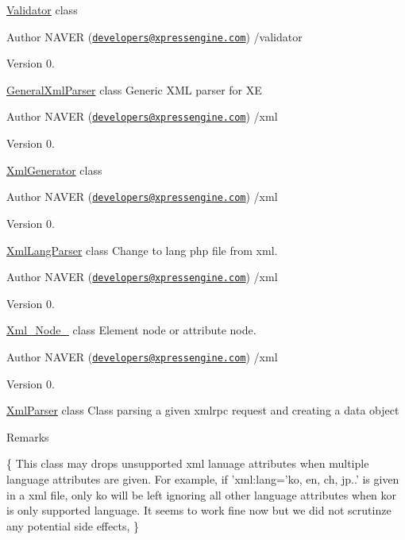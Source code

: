 \hyperlink{classValidator}{Validator} class \begin{DoxyAuthor}{Author}
N\+A\+V\+E\+R (\href{mailto:developers@xpressengine.com}{\tt developers@xpressengine.\+com}) /validator 
\end{DoxyAuthor}
\begin{DoxyVersion}{Version}
0.
\end{DoxyVersion}
\hyperlink{classGeneralXmlParser}{General\+Xml\+Parser} class Generic X\+M\+L parser for X\+E \begin{DoxyAuthor}{Author}
N\+A\+V\+E\+R (\href{mailto:developers@xpressengine.com}{\tt developers@xpressengine.\+com}) /xml 
\end{DoxyAuthor}
\begin{DoxyVersion}{Version}
0.
\end{DoxyVersion}
\hyperlink{classXmlGenerator}{Xml\+Generator} class \begin{DoxyAuthor}{Author}
N\+A\+V\+E\+R (\href{mailto:developers@xpressengine.com}{\tt developers@xpressengine.\+com}) /xml 
\end{DoxyAuthor}
\begin{DoxyVersion}{Version}
0.
\end{DoxyVersion}
\hyperlink{classXmlLangParser}{Xml\+Lang\+Parser} class Change to lang php file from xml. \begin{DoxyAuthor}{Author}
N\+A\+V\+E\+R (\href{mailto:developers@xpressengine.com}{\tt developers@xpressengine.\+com}) /xml 
\end{DoxyAuthor}
\begin{DoxyVersion}{Version}
0.
\end{DoxyVersion}
\hyperlink{classXml__Node__}{Xml\+\_\+\+Node\+\_\+} class Element node or attribute node. \begin{DoxyAuthor}{Author}
N\+A\+V\+E\+R (\href{mailto:developers@xpressengine.com}{\tt developers@xpressengine.\+com}) /xml 
\end{DoxyAuthor}
\begin{DoxyVersion}{Version}
0.
\end{DoxyVersion}
\hyperlink{classXmlParser}{Xml\+Parser} class Class parsing a given xmlrpc request and creating a data object \begin{DoxyRemark}{Remarks}

\begin{DoxyPre}\{ 
This class may drops unsupported xml lanuage attributes when multiple language attributes are given.
For example, if 'xml:lang='ko, en, ch, jp..' is given in a xml file, only ko will be left ignoring all other language
attributes when kor is only supported language. It seems to work fine now but we did not scrutinze any potential side effects,
\}\end{DoxyPre}

\end{DoxyRemark}
